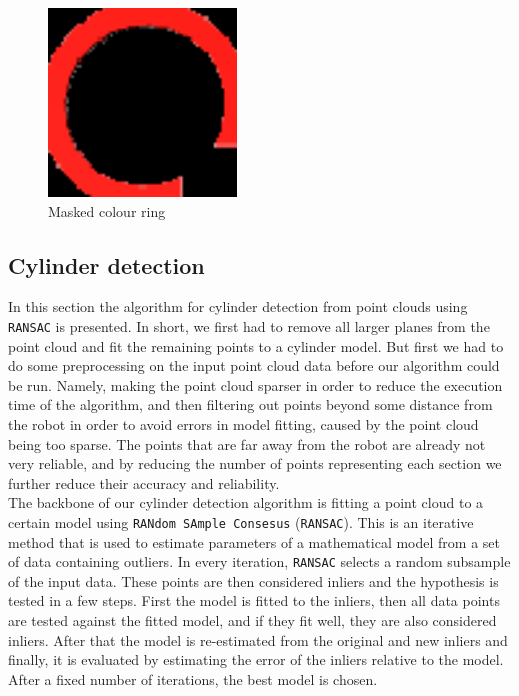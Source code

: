 \documentclass[12pt,a4paper]{article}
\begin{document}
	\begin{figure}[h]
		\centering
		\includegraphics[height=5cm]{images/ring_detection_colour}
		\caption{Masked colour ring}
		\label{fig:masked_colour_ring}
	\end{figure}
		
	\subsection{Cylinder detection} \label{cylinder_detection}
	In this section the algorithm for cylinder detection from point clouds using \texttt{RANSAC} is presented. In short, we first had to remove all larger planes from the point cloud and fit the remaining points to a cylinder model. But first we had to do some preprocessing on the input point cloud data before our algorithm could be run. Namely, making the point cloud sparser in order to reduce the execution time of the algorithm, and then filtering out points beyond some distance from the robot in order to avoid errors in model fitting, caused by the point cloud being too sparse. The points that are far away from the robot are already not very reliable, and by reducing the number of points representing each section we further reduce their accuracy and reliability. \\

	The backbone of our cylinder detection algorithm is fitting a point cloud to a certain model using \texttt{RANdom SAmple Consesus} (\texttt{RANSAC}). This is an iterative method that is used to estimate parameters of a mathematical model from a set of data containing outliers. In every iteration, \texttt{RANSAC} selects a random subsample of the input data. These points are then considered inliers and the hypothesis is tested in a few steps. First the model is fitted to the inliers, then all data points are tested against the fitted model, and if they fit well, they are also considered inliers. After that the model is re-estimated from the original and new inliers and finally, it is evaluated by estimating the error of the inliers relative to the model. After a fixed number of iterations, the best model is chosen. \\
	
\end{document}

